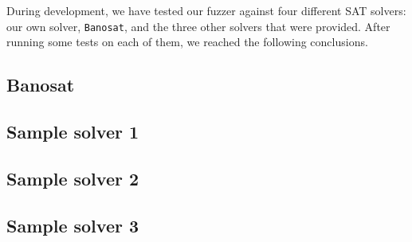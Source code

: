 \documentclass{article}
\begin{document}
During development, we have tested our fuzzer against four different SAT solvers: our own solver, \verb|Banosat|, and
the three other solvers that were provided. After running some tests on each of them, we reached the following conclusions.

\subsection{Banosat}



\subsection{Sample solver 1}

\subsection{Sample solver 2}

\subsection{Sample solver 3}
\end{document}
